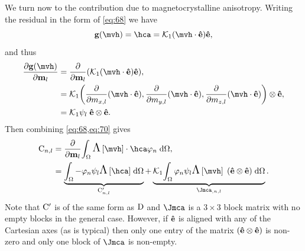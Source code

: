 {We turn now to the contribution due to magnetocrystalline anisotropy.
Writing the residual in the form of \cref{eq:68} we have
\begin{equation}
  \gv(\mvh) = \hca = \kone (\mvh \cdot \ev) \ev,
\end{equation}
and thus
\begin{equation}
  \begin{aligned}
    \pd{\gv(\mvh)}{\mv_l} &= \pd{}{\mv_l} \bigb{ \kone (\mvh \cdot \ev) \ev}, \\
    &= \kone \bigb{ \pd{}{m_{x,l}} (\mvh \cdot \ev),
      \pd{}{m_{y,l}} (\mvh \cdot \ev),
      \pd{}{m_{z,l}} (\mvh \cdot \ev) }  \tensorprod \ev, \\
    &= \kone \sbf_l \; \ev  \tensorprod \ev.
    \label{eq:70}
  \end{aligned}
\end{equation}
Then combining \cref{eq:68,eq:70} gives
\begin{equation}
  \begin{aligned}
    \Cm_{n,l} &= \pd{}{\mv_l} \intd{ \skewm{\mvh} \cdot \hca  \tbf_n}, \\
    &= \underbrace{\intd{ -\tbf_n \sbf_l\skewm{\hca} }}_{\Cm'_{n,l}}
    + \underbrace{\kone \intd{ \tbf_n \sbf_l \skewm{\mvh} \; (\ev  \tensorprod \ev) }}_{\Jmca_{,n,l}}.
    \label{eq:hca-jacobian}
  \end{aligned}
\end{equation}
Note that $\mathrm{C}'$ is of the same form as $\mathrm{D}$ and $\Jmca$ is a $3\times3$ block matrix with no empty blocks in the general case.
However, if $\boldsymbol{\mathrm{\hat{e}}}$ is aligned with any of the Cartesian axes (as is typical) then only one entry of the matrix $(\boldsymbol{\mathrm{\hat{e}}} \otimes \boldsymbol{\mathrm{\hat{e}}})$ is non-zero and only one block of $\Jmca$ is non-empty.

}
